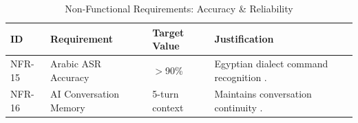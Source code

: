 \documentclass[12pt,a4paper]{report}
\renewcommand{\arraystretch}{1.45}
\renewcommand{\arraystretch}{1.3}
\begin{document}
\begin{table}[H]
\centering
\caption{Non-Functional Requirements: Accuracy \& Reliability}
\label{tab:nfr_acc}
{\renewcommand{\arraystretch}{1.6}
\begin{tabularx}{\textwidth}{@{}p{1cm}p{3cm}p{2cm}X@{}}
\toprule
\textbf{ID} & \textbf{Requirement} & \textbf{Target Value} & \textbf{Justification} \\
\midrule
NFR-15 & Arabic ASR Accuracy        & $>$90\%    & Egyptian dialect command recognition . \\
\midrule
NFR-16 & AI Conversation Memory     & 5-turn context & Maintains conversation continuity \cite{llama}. \\


\bottomrule
\end{tabularx}}
\end{table}

\clearpage
\end{document}
